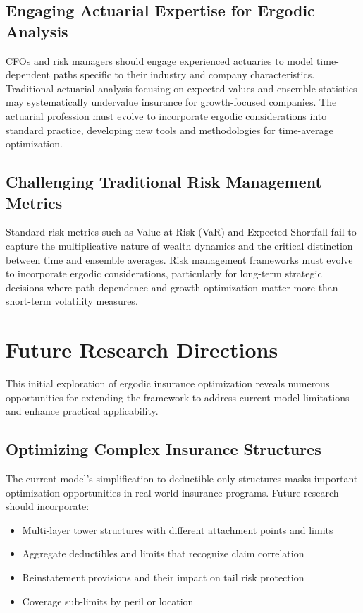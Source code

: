 \documentclass[11pt,letterpaper]{article}
\begin{document}
\subsection{Engaging Actuarial Expertise for Ergodic Analysis}

CFOs and risk managers should engage experienced actuaries to model time-dependent paths specific to their industry and company characteristics. Traditional actuarial analysis focusing on expected values and ensemble statistics may systematically undervalue insurance for growth-focused companies. The actuarial profession must evolve to incorporate ergodic considerations into standard practice, developing new tools and methodologies for time-average optimization.

\subsection{Challenging Traditional Risk Management Metrics}

Standard risk metrics such as Value at Risk (VaR) and Expected Shortfall fail to capture the multiplicative nature of wealth dynamics and the critical distinction between time and ensemble averages. Risk management frameworks must evolve to incorporate ergodic considerations, particularly for long-term strategic decisions where path dependence and growth optimization matter more than short-term volatility measures.

\section{Future Research Directions}

This initial exploration of ergodic insurance optimization reveals numerous opportunities for extending the framework to address current model limitations and enhance practical applicability.

\subsection{Optimizing Complex Insurance Structures}

The current model's simplification to deductible-only structures masks important optimization opportunities in real-world insurance programs. Future research should incorporate:
\begin{itemize}
    \item Multi-layer tower structures with different attachment points and limits
    \item Aggregate deductibles and limits that recognize claim correlation
    \item Reinstatement provisions and their impact on tail risk protection
    \item Coverage sub-limits by peril or location
\end{itemize}
\end{document}
